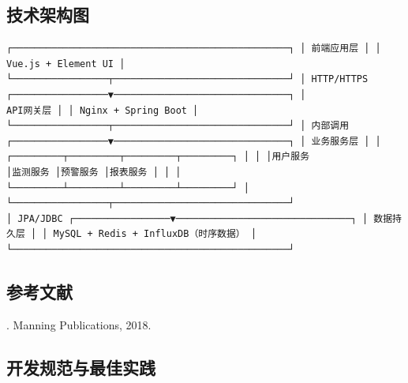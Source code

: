 \subsection{技术架构图}\label{ux6280ux672fux67b6ux6784ux56fe} \begin{lstlisting}
┌─────────────────────────────────────────────────┐ │ 前端应用层 │ │ Vue.js + Element UI │
└─────────────────┬───────────────────────────────┘ │ HTTP/HTTPS ┌─────────────────▼───────────────────────────────┐ │
API网关层 │ │ Nginx + Spring Boot │ └─────────────────┬───────────────────────────────┘ │ 内部调用
┌─────────────────▼───────────────────────────────┐ │ 业务服务层 │ │ ┌─────────┬─────────┬─────────┬─────────┐ │ │ │用户服务
│监测服务 │预警服务 │报表服务 │ │ │ └─────────┴─────────┴─────────┴─────────┘ │ └─────────────────┬───────────────────────────────┘
│ JPA/JDBC ┌─────────────────▼───────────────────────────────┐ │ 数据持久层 │ │ MySQL + Redis + InfluxDB（时序数据） │
└─────────────────────────────────────────────────┘ \end{lstlisting} \subsection{参考文献}\label{ux53c2ux8003ux6587ux732e} .
Manning Publications, 2018. \subsection{开发规范与最佳实践}\label{ux5f00ux53d1ux89c4ux8303ux4e0eux6700ux4f73ux5b9eux8df5}
